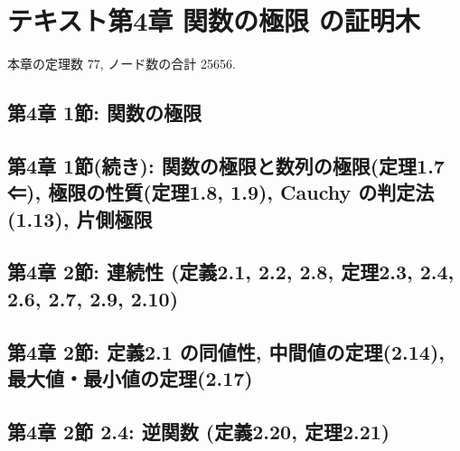 \chapter{テキスト第4章 関数の極限 の証明木}
本章の定理数 77, ノード数の合計 25656.

\section{第4章 1節: 関数の極限}











\section{第4章 1節(続き): 関数の極限と数列の極限(定理1.7 ⇐), 極限の性質(定理1.8, 1.9), Cauchy の判定法(1.13), 片側極限}





















\section{第4章 2節: 連続性 (定義2.1, 2.2, 2.8, 定理2.3, 2.4, 2.6, 2.7, 2.9, 2.10)}












\section{第4章 2節: 定義2.1 の同値性, 中間値の定理(2.14), 最大値・最小値の定理(2.17)}
















\section{第4章 2節 2.4: 逆関数 (定義2.20, 定理2.21)}







